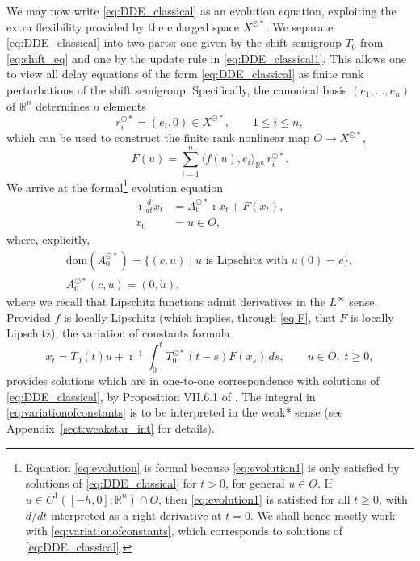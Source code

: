\documentclass[a4paper, 12pt, oneside, reqno, notitlepage]{amsart}
\theoremstyle{plain}
\theoremstyle{definition}
\theoremstyle{remark}
\newcommand{\dom}{\mathrm{dom}}
\begin{document}
We may now write \eqref{eq:DDE_classical} as an evolution equation, exploiting the extra flexibility provided by the enlarged space $X^{\odot *}$. 
We  separate \eqref{eq:DDE_classical} into two parts: one given by the shift semigroup $T_0$ from \eqref{eq:shift_eq} and one by the update rule in \eqref{eq:DDE_classical1}.
This allows one to  view all delay equations of the form \eqref{eq:DDE_classical} as finite rank perturbations of the shift semigroup.
Specifically, the canonical basis $(e_1,\ldots,e_n)$ of $\mathbb{R}^n$ determines $n$ elements
\begin{displaymath}
    r_i^{\odot *} = (e_i,0) \in X^{\odot *}, \qquad 1\leq i \leq n,
\end{displaymath}
which can be used to construct the finite rank nonlinear map $O \to X^{\odot *}$,
\begin{equation}
    F(u) = \sum_{i=1}^n \langle f(u),e_i\rangle_{\mathbb{R}^n} \, r_i^{\odot *}.
    \label{eq:F}
\end{equation}
We arrive at the formal\footnote{Equation \eqref{eq:evolution} is formal because \eqref{eq:evolution1} is only satisfied by solutions of \eqref{eq:DDE_classical} for $t > 0$, for general $u \in O$. If $u \in C^1([-h,0];\mathbb{R}^n)\cap O$, then \eqref{eq:evolution1} is satisfied for all $t \geq 0$, with $d/dt$ interpreted as a right derivative at $t = 0$. 
We shall hence mostly work with \eqref{eq:variationofconstants}, which corresponds to solutions of \eqref{eq:DDE_classical}.}
evolution equation 
\begin{subequations}\label{eq:evolution} 
    \begin{align}
        \imath \frac{d}{dt} x_t &= A_0^{\odot *} \imath x_t + F(x_t),  \label{eq:evolution1}\\
        x_0 &= u \in O,
    \end{align}
\end{subequations}
where, explicitly,
\begin{gather*}
    \dom(A_0^{\odot *}) = \{ (c,u) \; | \; u \text{ is Lipschitz with } u(0) = c \}, \\
    A_0^{\odot *}(c,u) =(0,\dot{u}),
\end{gather*}
where we recall that Lipschitz functions admit derivatives in the $L^\infty$ sense.
Provided $f$ is locally Lipschitz (which implies, through \eqref{eq:F}, that $F$ is locally Lipschitz),
 the variation of constants formula
\begin{equation}
    x_t = T_0(t) u + \imath^{-1} \int_{0}^t T_0^{\odot *} (t-s) F(x_s) \, ds, \qquad u \in O, \; t  \geq 0,
    \label{eq:variationofconstants}
\end{equation}
provides solutions which are in one-to-one correspondence with solutions of \eqref{eq:DDE_classical}, by Proposition VII.6.1 of \cite{diekmann2012delay}.
The integral in \eqref{eq:variationofconstants} is to be interpreted in the weak* sense (see Appendix~\ref{sect:weakstar_int} for details).
\end{document}
